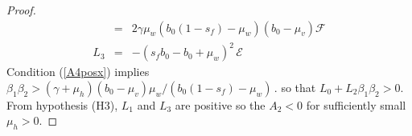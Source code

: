 \documentclass[12pt,leqno]{article}
\begin{document}
\begin{proof}
\begin{eqnarray*}
&=& 2\gamma\mu_w(b_0(1-s_f)-\mu_w)(b_0-\mu_v)\mathcal{F}\\
L_3 &=& -(s_fb_0-b_0+\mu_w)^2\,\mathcal{E}
\end{eqnarray*}
Condition (\ref{A4posx}) implies 
$\beta_1\beta_2 > (\gamma+\mu_h)(b_0-\mu_v)\mu_w/(b_0(1-s_f)-\mu_w)\,.$
so that $L_0+L_2\beta_1\beta_2 > 0$. From hypothesis (H3), $L_1$ and $L_3$ are positive so the $A_2 < 0$ for sufficiently small $\mu_h > 0$. 
\end{proof}

\begin{thebibliography}{10}
%
%





\end{thebibliography}
\end{document}
